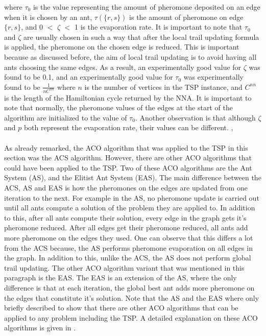 \documentclass[12pt]{article}
\numberwithin{equation}{subsection}
\numberwithin{table}{subsection}
\numberwithin{algorithm}{subsection}
\numberwithin{figure}{subsection}
\begin{document}
where $\tau_0$ is the value representing the amount of pheromone deposited on an edge when it is chosen by an ant, $\tau(\{r,s\})$ is the amount of pheromone on edge $\{r,s\}$, and 0 $<$ $\zeta$ $<$ 1 is the evaporation rate. It is important to note that $\tau_0$ and $\zeta$ are usually chosen in such a way that after the local trail updating formula is applied, the pheromone on the chosen edge is reduced. This is important because as discussed before, the aim of local trail updating is to avoid having all ants choosing the same edges. As a result, an experimentally good value for $\zeta$ was found to be 0.1, and an experimentally good value for $\tau_0$ was experimentally found to be $\displaystyle{\frac{1}{nC^{nn}}}$ where $n$ is the number of vertices in the TSP instance, and $C^{nn}$ is the length of the Hamiltonian cycle returned by the NNA. It is important to note that normally, the pheromone values of the edges at the start of the algorithm are initialized to the value of $\tau_0$. Another observation is that although $\zeta$ and $p$ both represent the evaporation rate, their values can be different. \cite{dorigo_gambardella_1997}, \cite{dorigo_stutzle_thomas_2004}\\\\
As already remarked, the ACO algorithm that was applied to the TSP in this section was the ACS algorithm. However, there are other ACO algorithms that could have been applied to the TSP. Two of these ACO algorithms are the Ant System (AS), and the Elitist Ant System (EAS). The main difference between the ACS, AS and EAS is how the pheromones on the edges are updated from one iteration to the next. For example in the AS, no pheromone update is carried out until all ants compute a solution of the problem they are applied to. In addition to this, after all ants compute their solution, every edge in the graph gets it's pheromone reduced. After all edges get their pheromone reduced, all ants add more pheromone on the edges they used. One can observe that this differs a lot from the ACS because, the AS performs pheromone evaporation on all edges in the graph. In addition to this, unlike the ACS, the AS does not perform global trail updating. The other ACO algorithm variant that was mentioned in this paragraph is the EAS. The EAS is an extension of the AS, where the only difference is that at each iteration, the global best ant adds more pheromone on the edges that constitute it's solution. Note that the AS and the EAS where only briefly described to show that there are other ACO algorithms that can be applied to any problem including the TSP. A detailed explanation on these ACO algorithms is given in \cite{dorigo_stutzle_thomas_2004}. \cite{dorigo_stutzle_thomas_2004}\\\\
\end{document}
